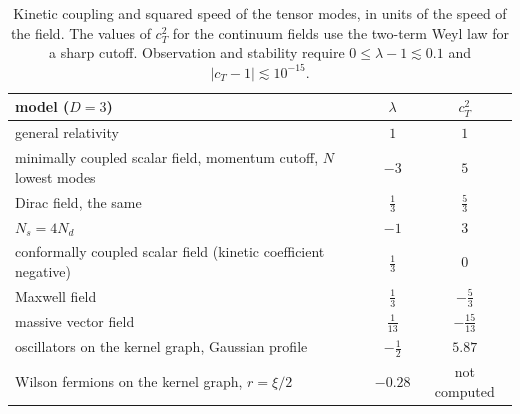 \documentclass[11pt,a4paper]{article}
\theoremstyle{stmt}
\theoremstyle{defn}
\theoremstyle{rmk}
\numberwithin{equation}{section}
\begin{document}
\begin{table}[h]
\centering\small
\begin{tabular}{lcc}
\toprule
model ($D=3$) & $\lambda$ & $c_T^2$\\
\midrule
general relativity & $1$ & $1$\\
minimally coupled scalar field, momentum cutoff, $N$ lowest modes & $-3$ & $5$\\
Dirac field, the same & $\tfrac13$ & $\tfrac53$\\
$N_s=4N_d$ & $-1$ & $3$\\
conformally coupled scalar field (kinetic coefficient negative) & $\tfrac13$ & $0$\\
Maxwell field & $\tfrac13$ & $-\tfrac53$\\
massive vector field & $\tfrac1{13}$ & $-\tfrac{15}{13}$\\
oscillators on the kernel graph, Gaussian profile & $-\tfrac12$ & $5.87$\\
Wilson fermions on the kernel graph, $r=\xi/2$ & $-0.28$ & not computed\\
\bottomrule
\end{tabular}
\caption{Kinetic coupling and squared speed of the tensor modes, in units of the speed of the field. The values of $c_T^2$ for the continuum fields use the two-term Weyl law for a sharp cutoff. Observation and stability require $0\le\lambda-1\lesssim0.1$ and $|c_T-1|\lesssim10^{-15}$.}\label{tab:models}
\end{table}
\end{document}
